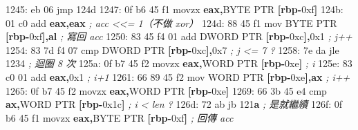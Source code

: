 \documentclass[10pt,a4paper]{article}
\newenvironment{Shaded}{\begin{snugshade}}{\end{snugshade}}
\newcommand{\BaseNTok}[1]{\textcolor[rgb]{0.00,0.00,0.81}{#1}}
\newcommand{\CommentTok}[1]{\textcolor[rgb]{0.56,0.35,0.01}{\textit{#1}}}
\newcommand{\DataTypeTok}[1]{\textcolor[rgb]{0.13,0.29,0.53}{#1}}
\newcommand{\DecValTok}[1]{\textcolor[rgb]{0.00,0.00,0.81}{#1}}
\newcommand{\ErrorTok}[1]{\textcolor[rgb]{0.64,0.00,0.00}{\textbf{#1}}}
\newcommand{\KeywordTok}[1]{\textcolor[rgb]{0.13,0.29,0.53}{\textbf{#1}}}
\newcommand{\NormalTok}[1]{#1}
\newcommand{\OperatorTok}[1]{\textcolor[rgb]{0.81,0.36,0.00}{\textbf{#1}}}
\renewenvironment{Shaded}{%
  \def\FrameCommand{\fboxsep=3.2pt\colorbox{shadecolor}}%
  \MakeFramed{\advance\hsize-\width\FrameRestore\small}%
}{%
  \endMakeFramed
}
\begin{document}
\begin{Shaded}
\begin{Highlighting}[]
\NormalTok{1245: eb }\DecValTok{06}\NormalTok{                  jmp    }\DecValTok{124}\BaseNTok{d}
\NormalTok{1247: 0f b6 }\DecValTok{45}\NormalTok{ f1            movzx  }\KeywordTok{eax}\OperatorTok{,}\DataTypeTok{BYTE} \DataTypeTok{PTR} \OperatorTok{[}\KeywordTok{rbp}\OperatorTok{{-}}\BaseNTok{0xf}\OperatorTok{]}
\NormalTok{124b: 01 c0                  add    }\KeywordTok{eax}\OperatorTok{,}\KeywordTok{eax}               \CommentTok{; acc \textless{}\textless{}= 1（不做 xor）}
\NormalTok{124d: 88 45 f1               mov    }\DataTypeTok{BYTE} \DataTypeTok{PTR} \OperatorTok{[}\KeywordTok{rbp}\OperatorTok{{-}}\BaseNTok{0xf}\OperatorTok{],}\KeywordTok{al} \CommentTok{; 寫回 acc}
\NormalTok{1250: 83 45 f4 }\DecValTok{01}\NormalTok{            add    }\DataTypeTok{DWORD} \DataTypeTok{PTR} \OperatorTok{[}\KeywordTok{rbp}\OperatorTok{{-}}\BaseNTok{0xc}\OperatorTok{],}\BaseNTok{0x1} \CommentTok{; j++}
\NormalTok{1254: 83 7d f4 }\DecValTok{07}\NormalTok{            cmp    }\DataTypeTok{DWORD} \DataTypeTok{PTR} \OperatorTok{[}\KeywordTok{rbp}\OperatorTok{{-}}\BaseNTok{0xc}\OperatorTok{],}\BaseNTok{0x7} \CommentTok{; j \textless{}= 7 ?}
\NormalTok{1258: 7e da                  jle    }\DecValTok{1234}                  \CommentTok{; 迴圈 8 次}
\NormalTok{125a: 0f b7 }\DecValTok{45}\NormalTok{ f2            movzx  }\KeywordTok{eax}\OperatorTok{,}\DataTypeTok{WORD} \DataTypeTok{PTR} \OperatorTok{[}\KeywordTok{rbp}\OperatorTok{{-}}\BaseNTok{0xe}\OperatorTok{]} \CommentTok{; i}
\NormalTok{125e: 83 c0 }\DecValTok{01}\NormalTok{               add    }\KeywordTok{eax}\OperatorTok{,}\BaseNTok{0x1}               \CommentTok{; i+1}
\NormalTok{1261: 66 89 45 f2            mov    }\DataTypeTok{WORD} \DataTypeTok{PTR} \OperatorTok{[}\KeywordTok{rbp}\OperatorTok{{-}}\BaseNTok{0xe}\OperatorTok{],}\KeywordTok{ax} \CommentTok{; i++}
\NormalTok{1265: 0f b7 }\DecValTok{45}\NormalTok{ f2            movzx  }\KeywordTok{eax}\OperatorTok{,}\DataTypeTok{WORD} \DataTypeTok{PTR} \OperatorTok{[}\KeywordTok{rbp}\OperatorTok{{-}}\BaseNTok{0xe}\OperatorTok{]}
\NormalTok{1269: 66 3b 45 e4            cmp    }\KeywordTok{ax}\OperatorTok{,}\DataTypeTok{WORD} \DataTypeTok{PTR} \OperatorTok{[}\KeywordTok{rbp}\OperatorTok{{-}}\BaseNTok{0x1c}\OperatorTok{]} \CommentTok{; i \textless{} len ?}
\NormalTok{126d: 72 ab                  jb     }\DecValTok{121}\ErrorTok{a}                  \CommentTok{; 是就繼續}
\NormalTok{126f: 0f b6 }\DecValTok{45}\NormalTok{ f1            movzx  }\KeywordTok{eax}\OperatorTok{,}\DataTypeTok{BYTE} \DataTypeTok{PTR} \OperatorTok{[}\KeywordTok{rbp}\OperatorTok{{-}}\BaseNTok{0xf}\OperatorTok{]} \CommentTok{; 回傳 acc}

\end{Highlighting}
\end{Shaded}
\end{document}
